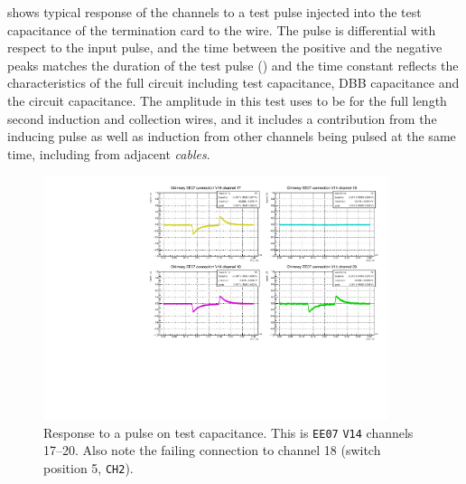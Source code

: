  shows typical response of the channels to a test
pulse injected into the test capacitance of the termination card to the wire.
The pulse is differential with respect to the input pulse, and the time between
the positive and the negative peaks matches the duration of the test pulse
() and the time constant reflects the characteristics of the
full circuit including test capacitance, DBB capacitance and the circuit
capacitance. The amplitude in this test uses to be 
for the full length second induction and collection wires, and it includes a
contribution from the inducing pulse as well as induction from other channels
being pulsed at the same time, including from adjacent \emph{cables}.
\begin{figure}
  \centering
    \includegraphics[width=0.9\textwidth]{fig/CPULSEWaves_ChimneyEE07_ConnV14_Pos5}
  \caption{
    Response to a pulse on test capacitance.
    This is \texttt{EE07} \texttt{V14} channels 17--20.
    Also note the failing connection to channel 18 (switch position 5, \texttt{CH2}).
    \label{fig:TestPulseResponse}
    \label{fig:TestBoxDeadChannel}
  }
\end{figure}

